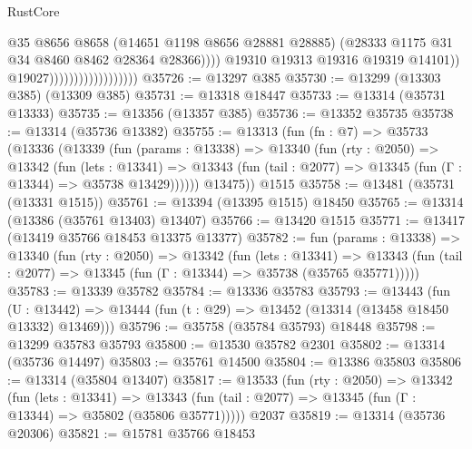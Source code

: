 \begin{lexlean}{RustCore}
\begin{coremodule}
                                                  @35
                                                  @8656
                                                  @8658
                                                  (@14651 @1198 @8656 @28881 @28885)
                                                  (@28333
                                                    @1175
                                                    @31
                                                    @34
                                                    @8460
                                                    @8462
                                                    @28364
                                                    @28366))))
                                            @19310
                                            @19313
                                            @19316
                                            @19319
                                            @14101))
                                        @19027))))))))))))))))))
@35726 := @13297 @385
@35730 := @13299 (@13303 @385) (@13309 @385)
@35731 := @13318 @18447
@35733 := @13314 (@35731 @13333)
@35735 := @13356 (@13357 @385)
@35736 := @13352 @35735
@35738 := @13314 (@35736 @13382)
@35755 := @13313
    (fun (fn : @7) =>
    @35733
      (@13336
        (@13339
          (fun (params : @13338) =>
          @13340
            (fun (rty : @2050) =>
            @13342
              (fun (lets : @13341) =>
              @13343 (fun (tail : @2077) => @13345 (fun (Γ : @13344) => @35738 @13429))))))
        @13475))
    @1515
@35758 := @13481 (@35731 (@13331 @1515))
@35761 := @13394 (@13395 @1515) @18450
@35765 := @13314 (@13386 (@35761 @13403) @13407)
@35766 := @13420 @1515
@35771 := @13417 (@13419 @35766 @18453 @13375 @13377)
@35782 := fun (params : @13338) =>
  @13340
    (fun (rty : @2050) =>
    @13342
      (fun (lets : @13341) =>
      @13343 (fun (tail : @2077) => @13345 (fun (Γ : @13344) => @35738 (@35765 @35771)))))
@35783 := @13339 @35782
@35784 := @13336 @35783
@35793 := @13443
    (fun (U : @13442) => @13444 (fun (t : @29) => @13452 (@13314 (@13458 @18450 @13332) @13469)))
@35796 := @35758 (@35784 @35793) @18448
@35798 := @13299 @35783 @35793
@35800 := @13530 @35782 @2301
@35802 := @13314 (@35736 @14497)
@35803 := @35761 @14500
@35804 := @13386 @35803
@35806 := @13314 (@35804 @13407)
@35817 := @13533
    (fun (rty : @2050) =>
    @13342
      (fun (lets : @13341) =>
      @13343 (fun (tail : @2077) => @13345 (fun (Γ : @13344) => @35802 (@35806 @35771)))))
    @2037
@35819 := @13314 (@35736 @20306)
@35821 := @15781 @35766 @18453

\end{coremodule}
\end{lexlean}
